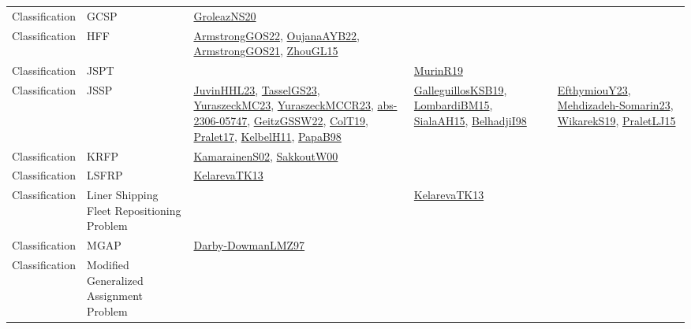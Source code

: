{\begin{longtable}{lp{3cm}>{\raggedright}p{6cm}>{\raggedright}p{6cm}p{8cm}}
Classification & GCSP & \href{papers/GroleazNS20.pdf}{GroleazNS20}\cite{GroleazNS20} &  & \\
Classification & HFF & \href{papers/ArmstrongGOS22.pdf}{ArmstrongGOS22}\cite{ArmstrongGOS22}, \href{papers/OujanaAYB22.pdf}{OujanaAYB22}\cite{OujanaAYB22}, \href{papers/ArmstrongGOS21.pdf}{ArmstrongGOS21}\cite{ArmstrongGOS21}, \href{papers/ZhouGL15.pdf}{ZhouGL15}\cite{ZhouGL15} &  & \\
Classification & JSPT &  & \href{papers/MurinR19.pdf}{MurinR19}\cite{MurinR19} & \\
Classification & JSSP & \href{papers/JuvinHHL23.pdf}{JuvinHHL23}\cite{JuvinHHL23}, \href{papers/TasselGS23.pdf}{TasselGS23}\cite{TasselGS23}, \href{papers/YuraszeckMC23.pdf}{YuraszeckMC23}\cite{YuraszeckMC23}, \href{articles/YuraszeckMCCR23.pdf}{YuraszeckMCCR23}\cite{YuraszeckMCCR23}, \href{articles/abs-2306-05747.pdf}{abs-2306-05747}\cite{abs-2306-05747}, \href{papers/GeitzGSSW22.pdf}{GeitzGSSW22}\cite{GeitzGSSW22}, \href{papers/ColT19.pdf}{ColT19}\cite{ColT19}, \href{papers/Pralet17.pdf}{Pralet17}\cite{Pralet17}, \href{articles/KelbelH11.pdf}{KelbelH11}\cite{KelbelH11}, \href{articles/PapaB98.pdf}{PapaB98}\cite{PapaB98} & \href{papers/GalleguillosKSB19.pdf}{GalleguillosKSB19}\cite{GalleguillosKSB19}, \href{papers/LombardiBM15.pdf}{LombardiBM15}\cite{LombardiBM15}, \href{papers/SialaAH15.pdf}{SialaAH15}\cite{SialaAH15}, \href{articles/BelhadjiI98.pdf}{BelhadjiI98}\cite{BelhadjiI98} & \href{papers/EfthymiouY23.pdf}{EfthymiouY23}\cite{EfthymiouY23}, \href{papers/Mehdizadeh-Somarin23.pdf}{Mehdizadeh-Somarin23}\cite{Mehdizadeh-Somarin23}, \href{articles/WikarekS19.pdf}{WikarekS19}\cite{WikarekS19}, \href{papers/PraletLJ15.pdf}{PraletLJ15}\cite{PraletLJ15}\\
Classification & KRFP & \href{papers/KamarainenS02.pdf}{KamarainenS02}\cite{KamarainenS02}, \href{articles/SakkoutW00.pdf}{SakkoutW00}\cite{SakkoutW00} &  & \\
Classification & LSFRP & \href{papers/KelarevaTK13.pdf}{KelarevaTK13}\cite{KelarevaTK13} &  & \\
Classification & Liner Shipping Fleet Repositioning Problem &  & \href{papers/KelarevaTK13.pdf}{KelarevaTK13}\cite{KelarevaTK13} & \\
Classification & MGAP & \href{articles/Darby-DowmanLMZ97.pdf}{Darby-DowmanLMZ97}\cite{Darby-DowmanLMZ97} &  & \\
Classification & Modified Generalized Assignment Problem &  &  & \\

\end{longtable}}
